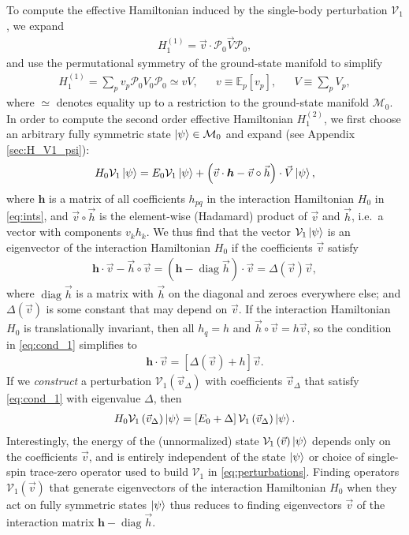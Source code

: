\documentclass[nofootinbib,notitlepage,11pt]{revtex4-2}
\newcommand{\p}[1]{\left(#1\right)} %
\renewcommand{\sp}[1]{\left[#1\right]} %
\renewcommand{\c}{\cdot} %
\renewcommand{\oc}{\circ} %
\newcommand{\m}{\bm} %
\renewcommand{\v}{\vec} %
\newcommand{\1}{\mathds{1}}
\newcommand{\M}{\mathcal{M}}
\renewcommand{\P}{\mathcal{P}}
\newcommand{\V}{\mathcal{V}}
\newcommand{\EE}{\mathbb{E}}
\DeclareMathOperator{\diag}{diag}
\begin{document}
To compute the effective Hamiltonian induced by the single-body
perturbation $\V_1$, we expand
\begin{align}
  H_1^{(1)} = \v v \c \P_0 \v V \P_0,
\end{align}
and use the permutational symmetry of the ground-state manifold to
simplify
\begin{align}
  H_1^{(1)} =  \sum_p v_p \P_0 V_0 \P_0 \simeq v V,
  &&
  v \equiv \EE_p\sp{v_p},
  &&
  V \equiv \sum_p V_p,
  \label{eq:H_1_1}
\end{align}
where $\simeq$ denotes equality up to a restriction to the
ground-state manifold $\M_0$.  In order to compute the second order
effective Hamiltonian $H_1^{(2)}$, we first choose an arbitrary fully
symmetric state $\ket\psi\in\M_0$ and expand (see Appendix
\ref{sec:H_V1_psi}):
\begin{align}
  H_0 \V_1 \ket\psi
  = E_0 \V_1 \ket\psi
  + \p{\v v\c\m h - \v v\oc\v h}\c \v V \ket\psi,
  \label{eq:H_V1_psi_start}
\end{align}
where $\m h$ is a matrix of all coefficients $h_{pq}$ in the
interaction Hamiltonian $H_0$ in \eqref{eq:ints}, and $\v v\oc\v h$ is
the element-wise (Hadamard) product of $\v v$ and $\v h$, i.e.~a
vector with components $v_kh_k$.  We thus find that the vector
$\V_1\ket\psi$ is an eigenvector of the interaction Hamiltonian $H_0$
if the coefficients $\v v$ satisfy
\begin{align}
  \m h \c \v v - \v h\oc\v v
  = \p{\m h - \diag\v h}\c\v v
  = \Delta\p{\v v} \v v,
  \label{eq:cond_1}
\end{align}
where $\diag\v h$ is a matrix with $\v h$ on the diagonal and zeroes
everywhere else; and $\Delta\p{\v v}$ is some constant that may depend
on $\v v$.  If the interaction Hamiltonian $H_0$ is translationally
invariant, then all $h_q=h$ and $\v h\oc\v v=h\v v$, so the condition
in \eqref{eq:cond_1} simplifies to
\begin{align}
  \m h \c\v v = \sp{\Delta\p{\v v}+h} \v v.
\end{align}
If we {\it construct} a perturbation $\V_1\p{\v v_\Delta}$ with
coefficients $\v v_\Delta$ that satisfy \eqref{eq:cond_1} with
eigenvalue $\Delta$, then
\begin{align}
  H_0 \V_1\p{\v v_\Delta} \ket\psi
  = \sp{E_0 + \Delta} \V_1\p{\v v_\Delta} \ket\psi.
  \label{eq:H_V1_psi}
\end{align}
Interestingly, the energy of the (unnormalized) state
$\V_1\p{\v v}\ket\psi$ depends only on the coefficients $\v v$, and is
entirely independent of the state $\ket\psi$ or choice of single-spin
trace-zero operator used to build $\V_1$ in \eqref{eq:perturbations}.
Finding operators $\V_1\p{\v v}$ that generate eigenvectors of the
interaction Hamiltonian $H_0$ when they act on fully symmetric states
$\ket\psi$ thus reduces to finding eigenvectors $\v v$ of the
interaction matrix $\m h-\diag\v h$.
\end{document}
